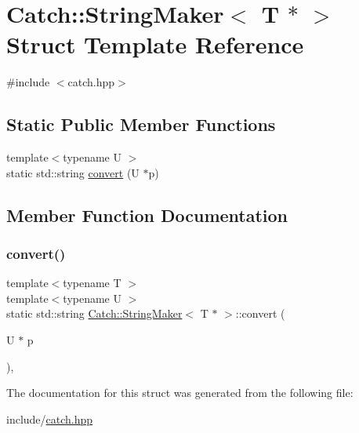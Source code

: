 \hypertarget{structCatch_1_1StringMaker_3_01T_01_5_01_4}{}\section{Catch\+:\+:String\+Maker$<$ T $\ast$ $>$ Struct Template Reference}
\label{structCatch_1_1StringMaker_3_01T_01_5_01_4}


{\ttfamily \#include $<$catch.\+hpp$>$}

\subsection*{Static Public Member Functions}
\begin{DoxyCompactItemize}
\item 
{\footnotesize template$<$typename U $>$ }\\static std\+::string \mbox{\hyperlink{structCatch_1_1StringMaker_3_01T_01_5_01_4_a2adbc75c99d71b8323f4052bcb0815c9}{convert}} (U $\ast$p)
\end{DoxyCompactItemize}


\subsection{Member Function Documentation}
\mbox{\label{structCatch_1_1StringMaker_3_01T_01_5_01_4_a2adbc75c99d71b8323f4052bcb0815c9}} 
\subsubsection{\texorpdfstring{convert()}{convert()}}
{\footnotesize\ttfamily template$<$typename T $>$ \\
template$<$typename U $>$ \\
static std\+::string \mbox{\hyperlink{structCatch_1_1StringMaker}{Catch\+::\+String\+Maker}}$<$ T $\ast$ $>$\+::convert (\begin{DoxyParamCaption}\item[{U $\ast$}]{p }\end{DoxyParamCaption})\hspace{0.3cm}{\ttfamily [inline]}, {\ttfamily [static]}}



The documentation for this struct was generated from the following file\+:\begin{DoxyCompactItemize}
\item 
include/\mbox{\hyperlink{catch_8hpp}{catch.\+hpp}}\end{DoxyCompactItemize}
